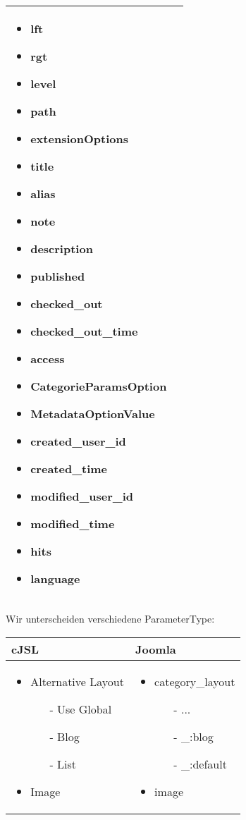 \begin{minipage}{0.7\textwidth}
\begin{tabular}{|p{} | p{}|}
\begin{itemize}
\item lft
\item rgt
\item level
\item path
\item  extensionOptions
\item  title
\item  alias
\item  note
\item  description
\item  published
\item  checked\_out
\item  checked\_out\_time
\item  access
\item  CategorieParamsOption
\item  MetadataOptionValue
\item  created\_user\_id
\item  created\_time
\item  modified\_user\_id
\item  modified\_time
\item  hits
\item  language
\end{itemize}
\\
\hline
\end{tabular}
\end{minipage}

Wir unterscheiden verschiedene ParameterType:

\begin{minipage}{0.5\textwidth}
\begin{tabular}{|p{} | p{}|}
\hline
\textbf{cJSL} & \textbf{Joomla} \\ 
\hline
\begin{itemize}
\item Alternative Layout
    \begin{enumerate}
		\item[-] Use Global
		\item[-] Blog 
		\item[-] List
	\end{enumerate}
\item Image
\end{itemize}
 & 
\begin{itemize}
\item category\_layout
    \begin{enumerate}
		\item[-] ...
		\item[-] \_:blog
		\item[-] \_:default
	\end{enumerate}
\item image
\end{itemize}
\\
\hline
\end{tabular}
\end{minipage}

